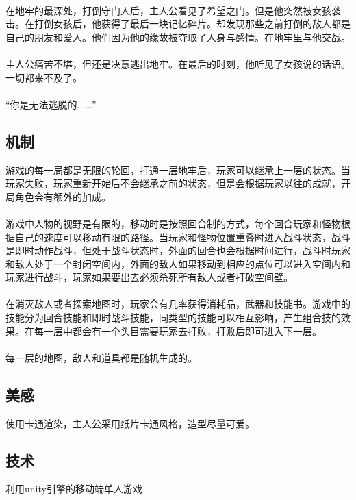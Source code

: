 \documentclass{article}
\begin{document}
\paragraph{}
在地牢的最深处，打倒守门人后，主人公看见了希望之门。但是他突然被女孩袭击。在打倒女孩后，他获得了最后一块记忆碎片。却发现那些之前打倒的敌人都是自己的朋友和爱人。他们因为他的缘故被夺取了人身与感情。在地牢里与他交战。
\paragraph{}
主人公痛苦不堪，但还是决意逃出地牢。在最后的时刻，他听见了女孩说的话语。一切都来不及了。
\paragraph{}
“你是无法逃脱的......”
\subsection{机制}
游戏的每一局都是无限的轮回，打通一层地牢后，玩家可以继承上一层的状态。当玩家失败，玩家重新开始后不会继承之前的状态，但是会根据玩家以往的成就，开局角色会有额外的加成。
\paragraph{}
游戏中人物的视野是有限的，移动时是按照回合制的方式，每个回合玩家和怪物根据自己的速度可以移动有限的路径。当玩家和怪物位置重叠时进入战斗状态，战斗是即时动作战斗，但处于战斗状态时，外面的回合也会根据时间进行，战斗时玩家和敌人处于一个封闭空间内，外面的敌人如果移动到相应的点位可以进入空间内和玩家进行战斗，玩家如果要出去必须杀死所有敌人或者打破空间壁。
\paragraph{}
在消灭敌人或者探索地图时，玩家会有几率获得消耗品，武器和技能书。游戏中的技能分为回合技能和即时战斗技能，同类型的技能可以相互影响，产生组合技的效果。在每一层中都会有一个头目需要玩家去打败，打败后即可进入下一层。
\paragraph{}
每一层的地图，敌人和道具都是随机生成的。
\subsection{美感}
使用卡通渲染，主人公采用纸片卡通风格，造型尽量可爱。
\subsection{技术}
利用unity引擎的移动端单人游戏
\end{document}
